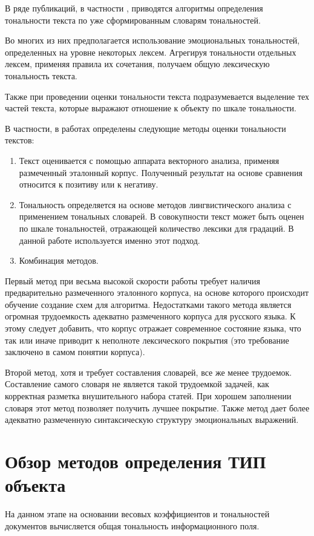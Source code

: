 \documentclass[a4paper,14pt,russian]{extreport}
\begin{document}
В ряде публикаций, в частности , приводятся алгоритмы определения тональности текста по уже сформированным словарям тональностей.

Во многих из них предполагается использование эмоциональных тональностей, определенных на уровне некоторых лексем. Агрегируя тональности отдельных лексем, применяя правила их сочетания, получаем общую лексическую тональность текста.

Также при проведении оценки тональности текста подразумевается выделение тех частей текста, которые выражают отношение к объекту по шкале тональности.

В частности, в работах определены следующие методы оценки тональности текстов:

\begin{enumerate}
\item Текст оценивается с помощью аппарата векторного анализа, применяя размеченный эталонный корпус. Полученный результат на основе сравнения относится к позитиву или к негативу.
\item Тональность определяется на основе методов лингвистического анализа с применением тональных словарей. В совокупности текст может быть оценен по шкале тональностей, отражающей количество лексики для градаций. В данной работе используется именно этот подход.
\item Комбинация методов.
\end{enumerate}

Первый метод при весьма высокой скорости работы требует наличия предварительно размеченного эталонного корпуса, на основе которого происходит обучение создание схем для алгоритма. Недостатками такого метода является огромная трудоемкость адекватно размеченного корпуса для русского языка. К этому следует добавить, что корпус отражает современное состояние языка, что так или иначе приводит к неполноте лексического покрытия (это требование заключено в самом понятии корпуса).

Второй метод, хотя и требует составления словарей, все же менее трудоемок. Составление самого словаря не является такой трудоемкой задачей, как корректная разметка внушительного набора статей. При хорошем заполнении словаря этот метод позволяет получить лучшее покрытие. Также метод дает более адекватно размеченную синтаксическую структуру эмоциональных выражений.
\section{Обзор методов определения ТИП объекта}
На данном этапе на основании весовых коэффициентов и тональностей документов вычисляется общая тональность информационного поля.
\end{document}

